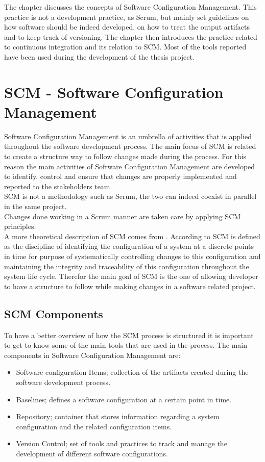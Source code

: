 \documentclass[../main.tex]{subfiles}
\begin{document}
The chapter discusses the concepts of Software Configuration Management. This practice is not a development practice, as Scrum, but mainly set guidelines on how software should be indeed developed, on how to treat the output artifacts and to keep track of versioning. The chapter then introduces the practice related to continuous integration and its relation to \gls{SCM}. Most of the tools reported have been used during the development of the thesis project.
\section{SCM - Software Configuration Management}
Software Configuration Management is an umbrella of activities that is applied throughout the software development process. The main focus of \gls{SCM} is related to create a structure way to follow changes made during the process. For this reason the main activities of Software Configuration Management are developed to identify, control and ensure that changes are properly implemented and reported to the stakeholders team.\\
\gls{SCM} is not a methodology such as Scrum, the two can indeed coexist in parallel in the same project.\\ Changes done working in a Scrum manner are taken care by applying \gls{SCM} principles.\\
A more theoretical description of \gls{SCM} comes from \cite{10.1007/978-3-319-32467-8_110}. According to \citet{10.1007/978-3-319-32467-8_110} \gls{SCM} is defined as the discipline of identifying the configuration of a system at a discrete points in time for purpose of systematically controlling changes to this configuration and maintaining the integrity and traceability of this configuration throughout the system life cycle. Therefor the main goal of \gls{SCM} is the one of allowing developer to have a structure to follow while making changes in a software related project.
\subsection{SCM Components}
To have a better overview of how the \gls{SCM} process is structured it is important to get to know some of the main tools that are used in the process.  The main components in Software Configuration Management are:
\begin{itemize}
    \item Software configuration Items; collection of the artifacts created during the software development process. 
    \item Baselines; defines a software configuration at a certain point in time.
    \item Repository; container that stores information regarding a system configuration and the related configuration items. 
    \item Version Control; set of tools and practices to track and manage the development of different software configurations. 
\end{itemize}
\end{document}
